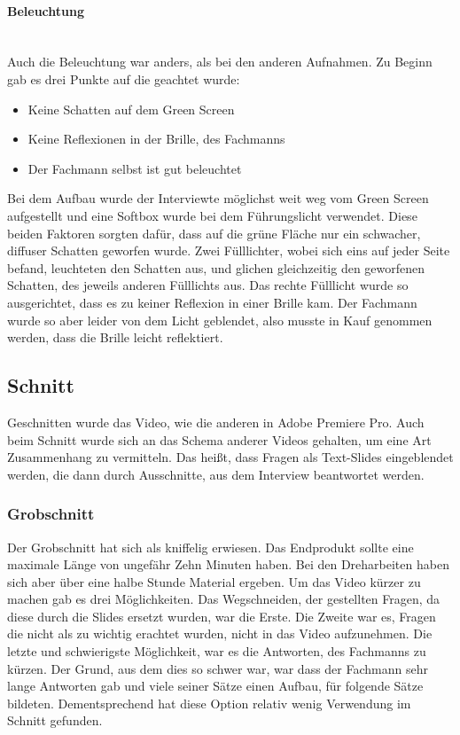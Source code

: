 \paragraph{Beleuchtung}
\leavevmode \\
Auch die Beleuchtung war anders, als bei den anderen Aufnahmen. Zu Beginn gab es drei Punkte auf die geachtet wurde:
\begin{itemize}
\item Keine Schatten auf dem Green Screen
\item Keine Reflexionen in der Brille, des Fachmanns
\item Der Fachmann selbst ist gut beleuchtet 
\end{itemize}
Bei dem Aufbau wurde der Interviewte möglichst weit weg vom Green Screen aufgestellt und eine Softbox wurde bei dem Führungslicht verwendet. Diese beiden Faktoren sorgten dafür, dass auf die grüne Fläche nur ein schwacher, diffuser Schatten geworfen wurde. Zwei Fülllichter, wobei sich eins auf jeder Seite befand, leuchteten den Schatten aus, und glichen gleichzeitig den geworfenen Schatten, des jeweils anderen Fülllichts aus. Das rechte Fülllicht wurde so ausgerichtet, dass es zu keiner Reflexion in einer Brille kam. Der Fachmann wurde so aber leider von dem Licht geblendet, also musste in Kauf genommen werden, dass die Brille leicht reflektiert.
\subsection{Schnitt}
Geschnitten wurde das Video, wie die anderen in Adobe Premiere Pro. Auch beim Schnitt wurde sich an das Schema anderer Videos gehalten, um eine Art Zusammenhang zu vermitteln. Das heißt, dass Fragen als Text-Slides eingeblendet werden, die dann durch Ausschnitte, aus dem Interview beantwortet werden.
\subsubsection{Grobschnitt}
Der Grobschnitt hat sich als kniffelig erwiesen. Das Endprodukt sollte eine maximale Länge von ungefähr Zehn Minuten haben. Bei den Dreharbeiten haben sich aber über eine halbe Stunde Material ergeben. Um das Video kürzer zu machen gab es drei Möglichkeiten. Das Wegschneiden, der gestellten Fragen, da diese durch die Slides ersetzt wurden, war die Erste. Die Zweite war es, Fragen die nicht als zu wichtig erachtet wurden, nicht in das Video aufzunehmen. Die letzte und schwierigste Möglichkeit, war es die Antworten, des Fachmanns zu kürzen. Der Grund, aus dem dies so schwer war, war dass der Fachmann sehr lange Antworten gab und viele seiner Sätze einen Aufbau, für folgende Sätze bildeten. Dementsprechend hat diese Option relativ wenig Verwendung im Schnitt gefunden.
